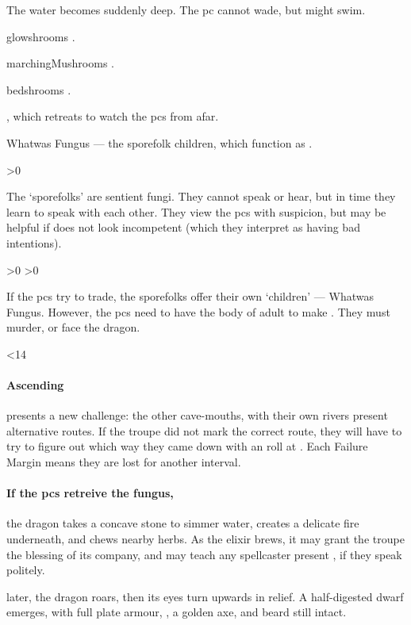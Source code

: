 \documentclass[10pt,twoside]{book}
\begin{document}
{
  \footnotesize
  \begin{dlist}
    \item
    The water becomes suddenly deep.
    The \gls{pc} cannot wade, but might swim.
    \item
    \Glspl{glowshroom} .
    \item
    \Glspl{marchingMushroom} .
    \item
    \Glspl{bedshroom} .
    \item
    , which retreats to watch the \glspl{pc} from afar.
    \item
    Whatwas Fungus --- the \gls{sporefolk} children, which function as .
  \end{dlist}
}


\randomize

\sporeFolk

\ifnum\value{Charisma}>0
  {\small{}}
\fi

\noindent
The `\glspl{sporefolk}' are sentient fungi.%
They cannot speak or hear, but in time they learn to speak with each other.
They view the \glspl{pc} with suspicion, but may be helpful if  does not look incompetent (which they interpret as having bad intentions).

\sporeFolk

\ifnum\value{Charisma}>0
  \ifnum\theage>0%
    {\small{}}
  \fi%
\fi

\wotWosFungus

\noindent
If the \glspl{pc} try to trade, the \glspl{sporefolk} offer their own `children' --- Whatwas Fungus.
However, the \glspl{pc} need to have the body of  adult to make .
They must murder, or face the dragon.

\showTalisman

\ifnum\thepage<14
  \sporeFolk
\fi

\paragraph{Ascending}
presents a new challenge: the other cave-mouths, with their own rivers present alternative routes.
If the troupe did not mark the correct route, they will have to try to figure out which way they came down with an  roll at \tn[10].
Each Failure Margin means they are lost for another \gls{interval}.

\paragraph{If the \glspl{pc} retreive the fungus,}
the dragon takes a concave stone to simmer water, creates a delicate fire underneath, and chews nearby herbs.
As the \gls{elixir} brews, it may grant the troupe the blessing of its company, and may teach any spellcaster present , if they speak politely.

 later, the dragon roars, then its eyes turn upwards in relief.
A half-digested dwarf emerges, with full plate armour, \lootBig, a golden axe, and beard still intact.
\end{document}
